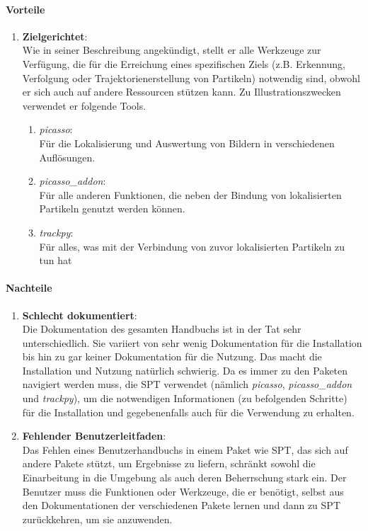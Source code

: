 	\paragraph{Vorteile}
		\begin{enumerate}
    			\item \textbf{Zielgerichtet}:\\
				Wie in seiner Beschreibung angekündigt, stellt er alle Werkzeuge zur Verfügung, die für die Erreichung eines spezifischen Ziels (z.B. Erkennung, Verfolgung oder Trajektorienerstellung von Partikeln) notwendig sind, obwohl er sich auch auf andere Ressourcen stützen kann. Zu Illustrationszwecken verwendet er folgende Tools.
				
				\begin{enumerate}
					\item \textit{picasso}:\\
				 		Für die Lokalisierung und Auswertung von Bildern in verschiedenen Auflösungen.
					\item \textit{picasso\_addon}:\\
						Für alle anderen Funktionen, die neben der Bindung von lokalisierten Partikeln genutzt werden 								können.
					\item \textit{trackpy}:\\
						Für alles, was mit der Verbindung von zuvor lokalisierten Partikeln zu tun hat
				\end{enumerate}
    			
		\end{enumerate}
		
	\paragraph{Nachteile}
		\begin{enumerate}
    			\item \textbf{Schlecht dokumentiert}:\\
				Die Dokumentation des gesamten Handbuchs ist in der Tat sehr unterschiedlich. Sie variiert von sehr wenig Dokumentation für die Installation bis hin zu gar keiner Dokumentation für die Nutzung.  Das macht die Installation und Nutzung natürlich schwierig. Da es immer zu den Paketen navigiert werden muss, die SPT verwendet (nämlich \textit{picasso}, \textit{picasso\_addon} und \textit{trackpy}), um die notwendigen Informationen (zu befolgenden Schritte) für die Installation und gegebenenfalls auch für die Verwendung zu erhalten.
				
    			\item \textbf{Fehlender Benutzerleitfaden}:\\
				Das Fehlen eines Benutzerhandbuchs in einem Paket wie SPT, das sich auf andere Pakete stützt, um Ergebnisse zu liefern, schränkt sowohl die Einarbeitung in die Umgebung als auch deren Beherrschung stark ein. Der Benutzer muss die Funktionen oder Werkzeuge, die er benötigt, selbst aus den Dokumentationen der verschiedenen Pakete lernen und dann zu SPT zurückkehren, um sie anzuwenden.
				
    			
		\end{enumerate}



